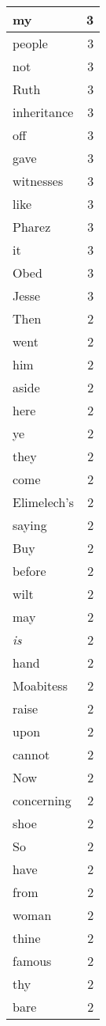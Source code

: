 \begin{center}
\begin{longtable}{l|r}
my & 3 \\ \hline
people & 3 \\ \hline
not & 3 \\ \hline
Ruth & 3 \\ \hline
inheritance & 3 \\ \hline
off & 3 \\ \hline
gave & 3 \\ \hline
witnesses & 3 \\ \hline
like & 3 \\ \hline
Pharez & 3 \\ \hline
it & 3 \\ \hline
Obed & 3 \\ \hline
Jesse & 3 \\ \hline
Then & 2 \\ \hline
went & 2 \\ \hline
him & 2 \\ \hline
aside & 2 \\ \hline
here & 2 \\ \hline
ye & 2 \\ \hline
they & 2 \\ \hline
come & 2 \\ \hline
Elimelech's & 2 \\ \hline
saying & 2 \\ \hline
Buy & 2 \\ \hline
before & 2 \\ \hline
wilt & 2 \\ \hline
may & 2 \\ \hline
\emph{is} & 2 \\ \hline
hand & 2 \\ \hline
Moabitess & 2 \\ \hline
raise & 2 \\ \hline
upon & 2 \\ \hline
cannot & 2 \\ \hline
Now & 2 \\ \hline
concerning & 2 \\ \hline
shoe & 2 \\ \hline
So & 2 \\ \hline
have & 2 \\ \hline
from & 2 \\ \hline
woman & 2 \\ \hline
thine & 2 \\ \hline
famous & 2 \\ \hline
thy & 2 \\ \hline
bare & 2 \\ \hline

\end{longtable}
\end{center}

